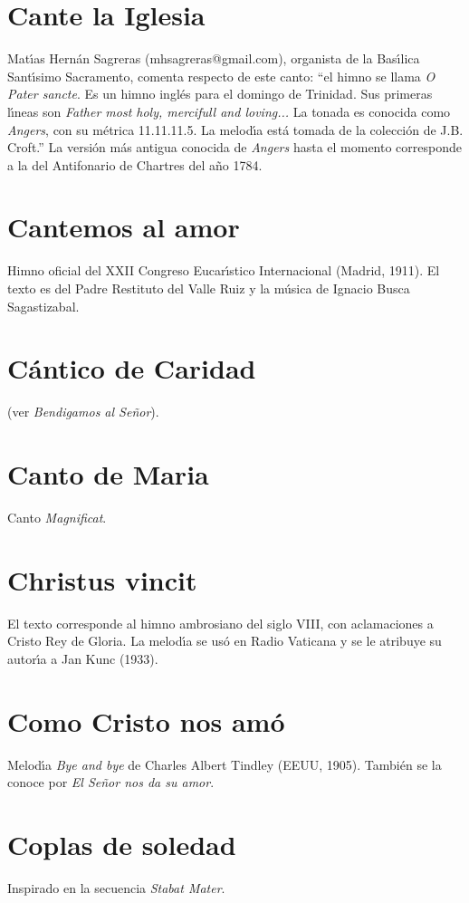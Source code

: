 \documentclass[landscape,12pt]{report}
\begin{document}
\section*{\small Cante la Iglesia} \noindent\footnotesize Mat\'\i as Hern\'an Sagreras (mhsagreras@gmail.com), organista de la Bas\'\i lica Sant\'\i simo Sacramento, comenta respecto de este canto: ``el himno se llama \textit{O Pater sancte}. Es un himno ingl\'es para el domingo de Trinidad. Sus primeras l\'\i neas son \textit{Father most holy, mercifull and loving...} La tonada es conocida como \textit{Angers}, con su m\'etrica 11.11.11.5. La melod\'\i a est\'a tomada de la colecci\'on de J.B. Croft.'' La versi\'on m\'as antigua conocida de \textit{Angers} hasta el momento corresponde a la del Antifonario de Chartres del a\~no 1784.
\section*{\small Cantemos al amor} \noindent\footnotesize Himno oficial del XXII Congreso Eucar\'\i stico Internacional (Madrid, 1911). El texto es del Padre Restituto del Valle Ruiz y la m\'usica de Ignacio Busca Sagastizabal. 
\section*{\small Cántico de Caridad} \noindent (ver \textit{Bendigamos al Señor}).
\section*{\small Canto de Maria} \noindent\footnotesize Canto \textit{Magnificat}.
\section*{\small Christus vincit} \noindent\footnotesize El texto corresponde al himno ambrosiano del siglo VIII, con aclamaciones a Cristo Rey de Gloria. La melod\'\i a  se us\'o en Radio Vaticana y se le atribuye su autor\'\i a a Jan Kunc (1933). 
\section*{\small Como Cristo nos am\'o} \noindent\footnotesize Melod\'\i a \emph{Bye and bye} de Charles Albert Tindley (EEUU, 1905). Tambi\'en se la conoce por \textit{El Se\~nor nos da su amor}. 
\section*{\small Coplas de soledad} \noindent\footnotesize Inspirado en la secuencia \textit{Stabat Mater}.
\end{document}
